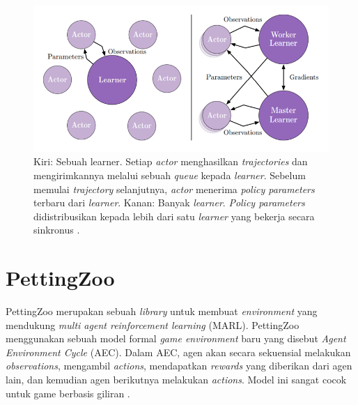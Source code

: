 \begin{figure}[H]
  \centering
    \includegraphics[scale=0.6]{gambar/impala_worker.png}
    \caption{Kiri: Sebuah learner. Setiap \emph{actor} menghasilkan \emph{trajectories} dan mengirimkannya melalui sebuah \emph{queue} kepada \emph{learner}.
    Sebelum memulai \emph{trajectory} selanjutnya, \emph{actor} menerima \emph{policy parameters} terbaru dari \emph{learner}.
    Kanan: Banyak \emph{learner}. \emph{Policy parameters} didistribusikan kepada lebih dari satu \emph{learner} yang bekerja secara sinkronus \citep{impala}.}
    \label{fig:impalaSingleVsMultipleLearner}
\end{figure}

\section{PettingZoo}

PettingZoo merupakan sebuah \emph{library} untuk membuat \emph{environment} yang mendukung \emph{multi agent reinforcement learning} (MARL).
PettingZoo menggunakan sebuah model formal \emph{game environment} baru yang disebut \emph{Agent Environment Cycle} (AEC). Dalam AEC, agen akan secara sekuensial melakukan \emph{observations}, mengambil \emph{actions}, mendapatkan \emph{rewards} yang diberikan dari agen lain, dan kemudian agen berikutnya melakukan \emph{actions}.
Model ini sangat cocok untuk game berbasis giliran \citep{pettingZoo}.

